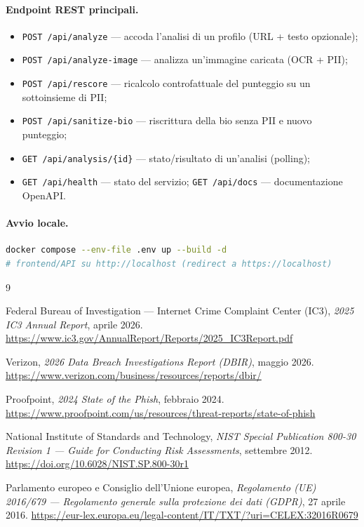 \documentclass[11pt,a4paper]{article}
\begin{document}
\paragraph{Endpoint REST principali.}
\begin{itemize}[nosep]
  \item \texttt{POST /api/analyze} — accoda l'analisi di un profilo (URL + testo opzionale);
  \item \texttt{POST /api/analyze-image} — analizza un'immagine caricata (OCR + PII);
  \item \texttt{POST /api/rescore} — ricalcolo controfattuale del punteggio su un sottoinsieme di PII;
  \item \texttt{POST /api/sanitize-bio} — riscrittura della bio senza PII e nuovo punteggio;
  \item \texttt{GET /api/analysis/\{id\}} — stato/risultato di un'analisi (polling);
  \item \texttt{GET /api/health} — stato del servizio; \texttt{GET /api/docs} — documentazione OpenAPI.
\end{itemize}

\paragraph{Avvio locale.}
\begin{lstlisting}[language=bash]
docker compose --env-file .env up --build -d
# frontend/API su http://localhost (redirect a https://localhost)
\end{lstlisting}


\clearpage
{}
\begin{thebibliography}{9}

 Federal Bureau of Investigation --- Internet Crime Complaint Center (IC3),
\emph{2025 IC3 Annual Report}, aprile 2026.
\url{https://www.ic3.gov/AnnualReport/Reports/2025_IC3Report.pdf}

 Verizon, \emph{2026 Data Breach Investigations Report (DBIR)}, maggio 2026.
\url{https://www.verizon.com/business/resources/reports/dbir/}

 Proofpoint, \emph{2024 State of the Phish}, febbraio 2024.
\url{https://www.proofpoint.com/us/resources/threat-reports/state-of-phish}

 National Institute of Standards and Technology,
\emph{NIST Special Publication 800-30 Revision 1 --- Guide for Conducting Risk Assessments},
settembre 2012. \url{https://doi.org/10.6028/NIST.SP.800-30r1}

 Parlamento europeo e Consiglio dell'Unione europea,
\emph{Regolamento (UE) 2016/679 --- Regolamento generale sulla protezione dei dati (GDPR)},
27 aprile 2016.
\url{https://eur-lex.europa.eu/legal-content/IT/TXT/?uri=CELEX:32016R0679}

\end{thebibliography}
\end{document}
